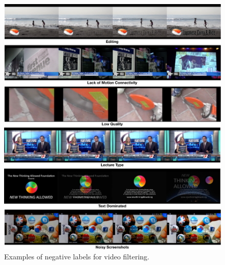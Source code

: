 \begin{figure}[ht]
\begin{center}
\includegraphics[width=0.9\linewidth]{images/data_filter/VideoFilter.pdf}
\end{center}
\vspace{-0.5em}
\caption{Examples of negative labels for video filtering.}
\label{fig:exp_filter}

\end{figure}

